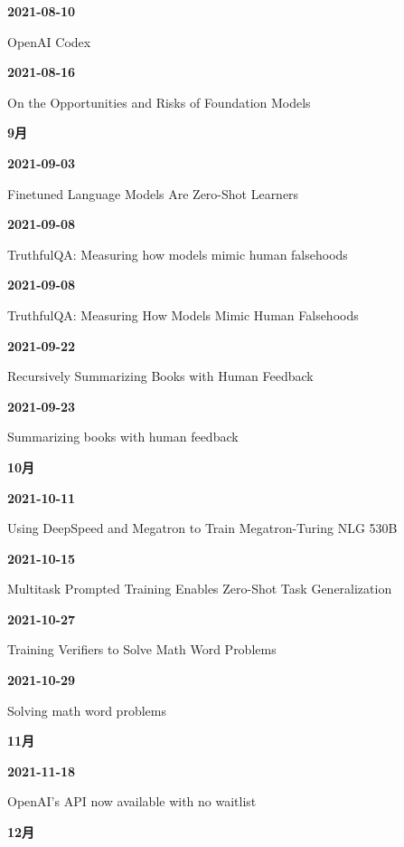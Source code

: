 \smallskip
\noindent\textbf{2021-08-10}\par
{\raggedright OpenAI Codex\par}
\smallskip
\noindent\textbf{2021-08-16}\par
{\raggedright On the Opportunities and Risks of Foundation Models\par}
\smallskip
\medskip
\noindent\textbf{9月}\par
\smallskip
\noindent\textbf{2021-09-03}\par
{\raggedright Finetuned Language Models Are Zero-Shot Learners\par}
\smallskip
\noindent\textbf{2021-09-08}\par
{\raggedright TruthfulQA: Measuring how models mimic human falsehoods\par}
\smallskip
\noindent\textbf{2021-09-08}\par
{\raggedright TruthfulQA: Measuring How Models Mimic Human Falsehoods\par}
\smallskip
\noindent\textbf{2021-09-22}\par
{\raggedright Recursively Summarizing Books with Human Feedback\par}
\smallskip
\noindent\textbf{2021-09-23}\par
{\raggedright Summarizing books with human feedback\par}
\smallskip
\medskip
\noindent\textbf{10月}\par
\smallskip
\noindent\textbf{2021-10-11}\par
{\raggedright Using DeepSpeed and Megatron to Train Megatron-Turing NLG 530B\par}
\smallskip
\noindent\textbf{2021-10-15}\par
{\raggedright Multitask Prompted Training Enables Zero-Shot Task Generalization\par}
\smallskip
\noindent\textbf{2021-10-27}\par
{\raggedright Training Verifiers to Solve Math Word Problems\par}
\smallskip
\noindent\textbf{2021-10-29}\par
{\raggedright Solving math word problems\par}
\smallskip
\medskip
\noindent\textbf{11月}\par
\smallskip
\noindent\textbf{2021-11-18}\par
{\raggedright OpenAI’s API now available with no waitlist\par}
\smallskip
\medskip
\noindent\textbf{12月}\par
